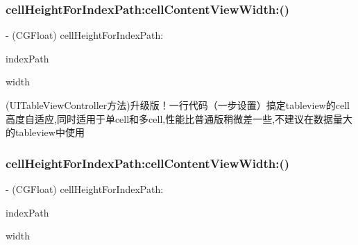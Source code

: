 \subsubsection{\texorpdfstring{cell\+Height\+For\+Index\+Path\+:cell\+Content\+View\+Width\+:()}{cellHeightForIndexPath:cellContentViewWidth:()}\hspace{0.1cm}{\footnotesize\ttfamily [1/3]}}
{\footnotesize\ttfamily -\/ (C\+G\+Float) cell\+Height\+For\+Index\+Path\+: \begin{DoxyParamCaption}\item[{(N\+S\+Index\+Path $\ast$)}]{index\+Path }\item[{cellContentViewWidth:(C\+G\+Float)}]{width }\end{DoxyParamCaption}}

(U\+I\+Table\+View\+Controller方法)升级版！一行代码（一步设置）搞定tableview的cell高度自适应,同时适用于单cell和多cell,性能比普通版稍微差一些,不建议在数据量大的tableview中使用 \mbox{\label{category_u_i_table_view_controller_07_s_d_table_view_controller_auto_cell_height_08_a0b27faff66706fa974400d4904f264c8}} 
\subsubsection{\texorpdfstring{cell\+Height\+For\+Index\+Path\+:cell\+Content\+View\+Width\+:()}{cellHeightForIndexPath:cellContentViewWidth:()}\hspace{0.1cm}{\footnotesize\ttfamily [2/3]}}
{\footnotesize\ttfamily -\/ (C\+G\+Float) cell\+Height\+For\+Index\+Path\+: \begin{DoxyParamCaption}\item[{(N\+S\+Index\+Path $\ast$)}]{index\+Path }\item[{cellContentViewWidth:(C\+G\+Float)}]{width }\end{DoxyParamCaption}}


